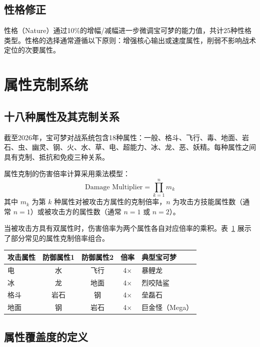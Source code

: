\subsection{性格修正}

性格（Nature）通过10\%的增幅/减幅进一步微调宝可梦的能力值，共计25种性格类型。性格的选择通常遵循以下原则：增强核心输出或速度属性，削弱不影响战术定位的次要属性。

\section{属性克制系统}

\subsection{十八种属性及其克制关系}

截至2026年，宝可梦对战系统包含18种属性：一般、格斗、飞行、毒、地面、岩石、虫、幽灵、钢、火、水、草、电、超能力、冰、龙、恶、妖精。每种属性之间具有克制、抵抗和免疫三种关系。

属性克制的伤害倍率计算采用乘法模型：
\begin{equation}\label{eq:type-effectiveness}
    \text{Damage Multiplier} = \prod_{k=1}^{n} m_k
\end{equation}
其中 $m_k$ 为第 $k$ 种属性对被攻击方属性的克制倍率，$n$ 为攻击方技能属性数（通常 $n=1$）或被攻击方的属性数（通常 $n=1$ 或 $n=2$）。

当被攻击方具有双属性时，伤害倍率为两个属性各自对应倍率的乘积。表~\ref{tab:type-chart} 展示了部分常见的属性克制倍率组合。

\begin{table}[!htbp]
    \label{tab:type-chart}
    \centering
    \footnotesize
    \begin{tabular}{lcccl}
        \hline
        攻击属性 & 防御属性1 & 防御属性2 & 倍率 & 典型宝可梦 \\
        \hline
        电 & 水 & 飞行 & 4× & 暴鲤龙 \\
        冰 & 龙 & 地面 & 4× & 烈咬陆鲨 \\
        格斗 & 岩石 & 钢 & 4× & 垒磊石 \\
        地面 & 钢 & 岩石 & 4× & 巨金怪（Mega） \\
        \hline
    \end{tabular}
\end{table}

\subsection{属性覆盖度的定义}

